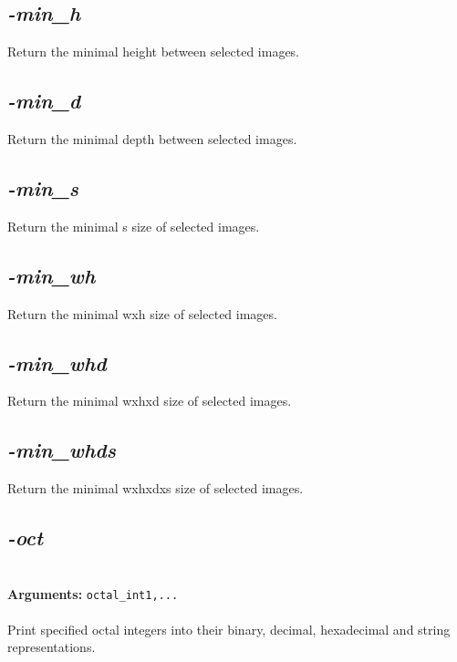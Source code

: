 \documentclass[a4paper,11pt,twoside]{book}
\begin{document}
\subsection{\emph{-min\_h} }\vspace*{-0.5em}
Return the minimal height between selected images.


\subsection{\emph{-min\_d} }\vspace*{-0.5em}
Return the minimal depth between selected images.


\subsection{\emph{-min\_s} }\vspace*{-0.5em}
Return the minimal s size of selected images.


\subsection{\emph{-min\_wh} }\vspace*{-0.5em}
Return the minimal wxh size of selected images.


\subsection{\emph{-min\_whd} }\vspace*{-0.5em}
Return the minimal wxhxd size of selected images.


\subsection{\emph{-min\_whds} }\vspace*{-0.5em}
Return the minimal wxhxdxs size of selected images.


\subsection{\emph{-oct} }\vspace*{-0.5em}
~\\\textbf{Arguments: } 
{\small \texttt{octal\_int1,...}}\\~\\
Print specified octal integers into their binary, decimal, hexadecimal and string representations.
\end{document}
